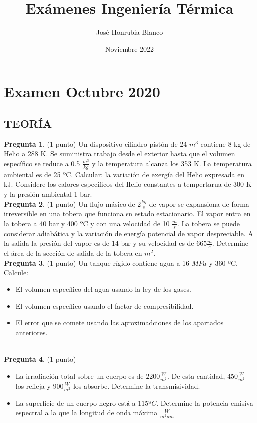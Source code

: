\documentclass[12pt]{article}
\title{Exámenes Ingeniería Térmica}
\author{José Honrubia Blanco }
\date{Noviembre 2022}
\begin{document}
\section{Examen Octubre 2020}
\subsection{TEORÍA}
\textbf{Pregunta 1}. (1 punto) Un dispositivo cilindro-pistón de 24 $m^{3}$ contiene 8 kg de Helio a 288 K. Se suministra trabajo desde el exterior hasta que el volumen específico se reduce a 0.5 $\frac{m ^{3}}{kg}$ y la temperatura alcanza los 353 K. La temperatura ambiental es de 25 ºC. Calcular: la variación de exergía del Helio expresada en kJ. Considere los calores específicos del Helio constantes a tempertarua de 300 K y la presión ambiental 1 bar.
\\ 
\textbf{Pregunta 2}. (1 punto) Un flujo másico de $2 \frac{kg}{s}$ de vapor se expansiona de forma irreversible en una tobera que funciona en estado estacionario. El vapor entra en la tobera a 40 bar y 400 ºC y con una velocidad de 10 $\frac{m}{s}$. La tobera se puede considerar adiabática y la variación de energía potencial de vapor despreciable. A la salida la presión del vapor es de 14 bar y su velocidad es de $665 \frac{m}{s}$. Determine el área de la sección de salida de la tobera en $m ^{2}$.
\\
\textbf{Pregunta 3}. (1 punto) Un tanque rígido contiene agua a 16 $MPa$ y 360 ºC. Calcule:
\begin{itemize}
    \item El volumen específico del agua usando la ley de los gases.
    \item El volumen específico usando el factor de compresibilidad.
    \item El error que se comete usando las aproximadciones de los apartados anteriores.
\end{itemize}
\\
\textbf{Pregunta 4}. (1 punto)
\begin{itemize}
    \item La irradiación total sobre un cuerpo es de $2200 \frac{W}{m ^{2}}$. De esta cantidad, $450 \frac{W}{m ^{2}}$ los refleja y $900 \frac{W}{m ^{2}}$ los absorbe. Determine la transmisividad.
    \item La superficie de un cuerpo negro está a $115 ºC$. Determine la potencia emisiva espectral a la que la longitud de onda máxima $\frac{W}{m ^{2}\mu m}$
\end{itemize}
\end{document}
